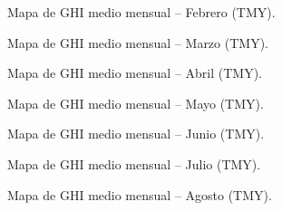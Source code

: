 \documentclass[letterpaper,12pt, twoside]{report}
\providecommand{\DIFdeltex}[1]{{\protect\color{red} \scriptsize #1}} %
\providecommand{\DIFdelFL}[1]{\DIFdel{#1}} %
\providecommand{\DIFdel}[1]{\texorpdfstring{\DIFdeltex{#1}}{}} %
\begin{document}
{%
\DIFdelFL{Mapa de GHI medio mensual – Febrero (TMY).}}

{%
\DIFdelFL{Mapa de GHI medio mensual – Marzo (TMY).}}

{%
\DIFdelFL{Mapa de GHI medio mensual – Abril (TMY).}}

{%
\DIFdelFL{Mapa de GHI medio mensual – Mayo (TMY).}}

{%
\DIFdelFL{Mapa de GHI medio mensual – Junio (TMY).}}

{%
\DIFdelFL{Mapa de GHI medio mensual – Julio (TMY).}}

{%
\DIFdelFL{Mapa de GHI medio mensual – Agosto (TMY).}}
\end{document}
